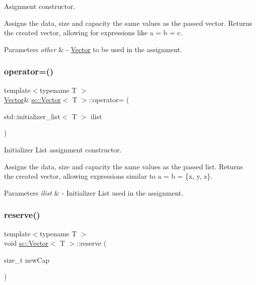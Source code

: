 Asignment constructor. 

Assigns the data, size and capacity the same values as the passed vector. Returns the created vector, allowing for expressions like a = b = c. 
\begin{DoxyParams}{Parameters}
{\em other} & -\/ \hyperlink{classsc_1_1Vector}{Vector} to be used in the assignment. \\
\hline
\end{DoxyParams}
\mbox{\label{classsc_1_1Vector_a4c1f64a652e6febd6e06e2bf24f83f8d}} 
\subsubsection{\texorpdfstring{operator=()}{operator=()}\hspace{0.1cm}{\footnotesize\ttfamily [2/2]}}
{\footnotesize\ttfamily template$<$typename T $>$ \\
\hyperlink{classsc_1_1Vector}{Vector}\& \hyperlink{classsc_1_1Vector}{sc\+::\+Vector}$<$ T $>$\+::operator= (\begin{DoxyParamCaption}\item[{std\+::initializer\+\_\+list$<$ T $>$}]{ilist }\end{DoxyParamCaption})\hspace{0.3cm}{\ttfamily [inline]}}



Initializer List assignment constructor. 

Assigns the data, size and capacity the same values as the passed list. Returns the created vector, allowing expressions similar to a = b = \{x, y, z\}. 
\begin{DoxyParams}{Parameters}
{\em ilist} & -\/ Initializer List used in the assignment. \\
\hline
\end{DoxyParams}
\mbox{\label{classsc_1_1Vector_a16435ab7524542a2197d202f45dc80d8}} 
\subsubsection{\texorpdfstring{reserve()}{reserve()}}
{\footnotesize\ttfamily template$<$typename T $>$ \\
void \hyperlink{classsc_1_1Vector}{sc\+::\+Vector}$<$ T $>$\+::reserve (\begin{DoxyParamCaption}\item[{size\+\_\+t}]{new\+Cap }\end{DoxyParamCaption})\hspace{0.3cm}{\ttfamily [inline]}}



